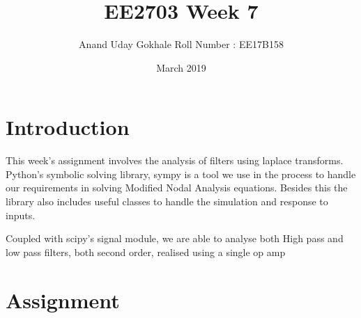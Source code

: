 \documentclass{article}
\title{EE2703 Week 7}
\author{Anand Uday Gokhale Roll Number : EE17B158 }
\date{March 2019}
\begin{document}
\maketitle

\section{Introduction}
This week's assignment involves the analysis of filters using laplace transforms. Python's symbolic solving library, sympy is a tool we use in the process to handle our requirements in solving Modified Nodal Analysis  equations. Besides this the library also includes useful classes to handle the simulation and response to inputs.

Coupled with scipy's signal module, we are able to analyse both High pass and low pass filters, both second order, realised using a single op amp

\section{Assignment}
\end{document}
